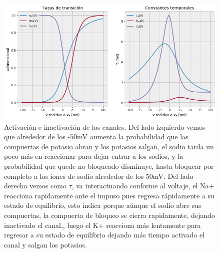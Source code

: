 \begin{figure}[h]
 \centering
 \includegraphics[scale=0.6]{../Figuras/actinac.png}
 \caption{Activación e inactivación de los canales. Del lado izquierdo vemos que alrededor de los -50mV aumenta la probabilidad que las compuertas de potasio abran y los potasios salgan, el sodio tarda un poco más en reaccionar para dejar entrar a los sodios, y la probabilidad que quede no bloqueado disminuye, hasta bloquear por completo a los iones de sodio alrededor de los 50mV. Del lado derecho vemos como \(\tau\), va interactuando conforme al voltaje, el Na+ reacciona rapidamente ante el impuso pues regresa rápidamente a su estado de equilibrio, esto indica porque aúnque el sodio abre sus compuertas, la compuerta de bloqueo se cierra rapidamente, dejando inactivado el canal,, luego el K+ reacciona más lentamente para regresar a su estado de equilibrio dejando más tiempo activado el canal y salgan los potasios.}
 \label{fig:voltajeActInac}
\end{figure}


